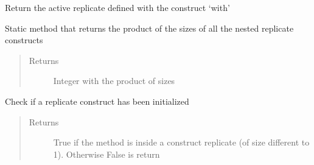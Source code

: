 \documentclass[letterpaper,10pt,english]{sphinxmanual}
\begin{document}
\begin{fulllineitems}
\begin{fulllineitems}
\end{fulllineitems}


\begin{fulllineitems}
\label{\detokenize{modules/inferpy.models:inferpy.models.replicate.replicate.get_active_replicate}}
Return the active replicate defined with the construct ‘with’

\end{fulllineitems}


\begin{fulllineitems}
\label{\detokenize{modules/inferpy.models:inferpy.models.replicate.replicate.get_all_replicate}}
\end{fulllineitems}


\begin{fulllineitems}
\label{\detokenize{modules/inferpy.models:inferpy.models.replicate.replicate.get_total_size}}
Static method that returns the product of the sizes of all the nested replicate constructs
\begin{quote}\begin{description}
\item[{Returns}] \leavevmode
Integer with the product of sizes

\end{description}\end{quote}

\end{fulllineitems}


\begin{fulllineitems}
\label{\detokenize{modules/inferpy.models:inferpy.models.replicate.replicate.in_replicate}}
Check if a replicate construct has been initialized
\begin{quote}\begin{description}
\item[{Returns}] \leavevmode
True if the method is inside a construct replicate (of size different to 1).
Otherwise False is return


\end{description}
\end{quote}
\end{fulllineitems}
\end{fulllineitems}
\end{document}
